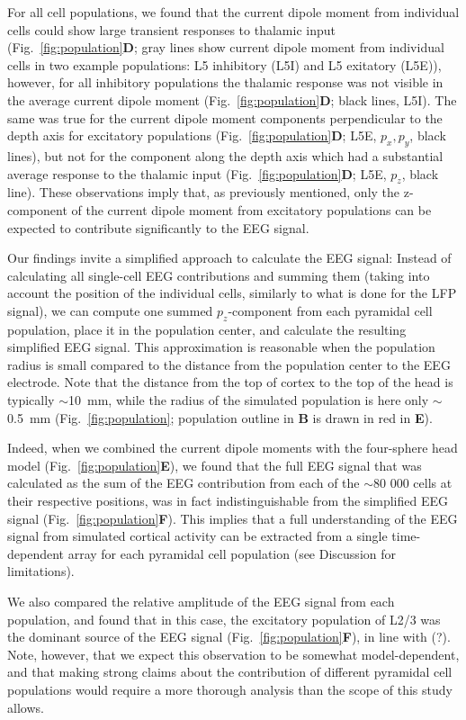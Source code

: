 \documentclass[preprint,10pt,authoryear]{elsarticle}
\newcommand{\hlg}[2][Emerald]{ {\sethlcolor{#1} \hl{#2}} }
\newcommand{\tvnnote}[1]{\color{white}{\hlg{TVN: #1 }}\color{black}}
\begin{document}
For all cell populations, we found that the current dipole moment from individual cells could show large transient responses to thalamic input (Fig.~\ref{fig:population}\textbf{D}; gray lines show current dipole moment from individual cells in two example populations: L5 inhibitory (L5I) and L5 exitatory (L5E)), however, for all inhibitory populations the thalamic response was not visible in the average current dipole moment (Fig.~\ref{fig:population}\textbf{D}; black lines, L5I). The same was true for the current dipole moment components perpendicular to the depth axis for excitatory populations (Fig.~\ref{fig:population}\textbf{D}; L5E, $p_x, p_y$, black lines), but not for the component along the depth axis which had a substantial average response to the thalamic input (Fig.~\ref{fig:population}\textbf{D}; L5E, $p_z$, black line). 
These observations imply that, as previously mentioned, only the z-component of the current dipole moment from excitatory populations can be expected to contribute significantly to the EEG signal.

Our findings invite a simplified approach to calculate the EEG signal: Instead of calculating all single-cell EEG contributions and summing them (taking into account the position of the individual cells, similarly to what is done for the LFP signal), we can compute one summed $p_z$-component from each pyramidal cell population, place it in the population center, and calculate the resulting simplified EEG signal. This approximation is reasonable when the population radius is small compared to the distance from the population center to the EEG electrode. Note that the distance from the top of cortex to the top of the head is typically $\sim$10~mm, while the radius of the simulated population is here only $\sim$0.5~mm (Fig.~\ref{fig:population}; population outline in \textbf{B} is drawn in red in \textbf{E}).

Indeed, when we combined the current dipole moments with the four-sphere head model (Fig.~\ref{fig:population}\textbf{E}), we found that the full EEG signal that was calculated as the sum of the EEG contribution from each of the $\sim$80 000 cells at their respective positions, was in fact indistinguishable from the simplified EEG signal (Fig.~\ref{fig:population}\textbf{F}). This implies that a full understanding of the EEG signal from simulated cortical activity can be extracted from a single time-dependent array for each pyramidal cell population (see Discussion for limitations).

We also compared the relative amplitude of the EEG signal from each population, and found that in this case, the excitatory population of L2/3 was the dominant source of the EEG signal (Fig.~\ref{fig:population}\textbf{F}), in line with (?)\tvnnote{(cite!)}. Note, however, that we expect this observation to be somewhat model-dependent, and that making strong claims about the contribution of different pyramidal cell populations would require a more thorough analysis than the scope of this study allows.
\end{document}
